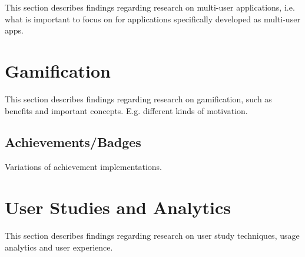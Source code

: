 This section describes findings regarding research on multi-user applications, i.e. what is important to focus on for applications specifically developed as multi-user apps.


\section{Gamification}

This section describes findings regarding research on gamification, such as benefits and important concepts. E.g. different kinds of motivation.

\subsection{Achievements/Badges}

Variations of achievement implementations.


\section{User Studies and Analytics}

This section describes findings regarding research on user study techniques, usage analytics and user experience.